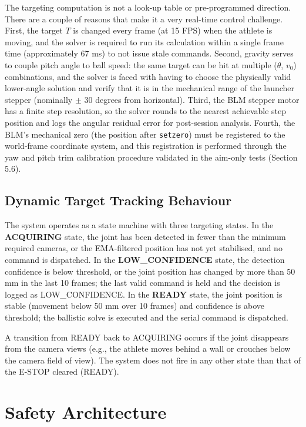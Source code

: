 The targeting computation is not a look-up table or pre-programmed direction. There are a couple of reasons that make it a very real-time control challenge. First, the target $T$ is changed every frame (at 15 FPS) when the athlete is moving, and the solver is required to run its calculation within a single frame time (approximately 67 ms) to not issue stale commands. Second, gravity serves to couple pitch angle to ball speed: the same target can be hit at multiple ($\theta$, $v_0$) combinations, and the solver is faced with having to choose the physically valid lower-angle solution and verify that it is in the mechanical range of the launcher stepper (nominally $\pm$ 30 degrees from horizontal). Third, the BLM stepper motor has a finite step resolution, so the solver rounds to the nearest achievable step position and logs the angular residual error for post-session analysis. Fourth, the BLM's mechanical zero (the position after \texttt{setzero}) must be registered to the world-frame coordinate system, and this registration is performed through the yaw and pitch trim calibration procedure validated in the aim-only tests (Section 5.6).

\subsection{Dynamic Target Tracking Behaviour}

The system operates as a state machine with three targeting states. In the \textbf{ACQUIRING} state, the joint has been detected in fewer than the minimum required cameras, or the EMA-filtered position has not yet stabilised, and no command is dispatched. In the \textbf{LOW\_CONFIDENCE} state, the detection confidence is below threshold, or the joint position has changed by more than 50 mm in the last 10 frames; the last valid command is held and the decision is logged as LOW\_CONFIDENCE. In the \textbf{READY} state, the joint position is stable (movement below 50 mm over 10 frames) and confidence is above threshold; the ballistic solve is executed and the serial command is dispatched.

A transition from READY back to ACQUIRING occurs if the joint disappears from the camera views (e.g., the athlete moves behind a wall or crouches below the camera field of view). The system does not fire in any other state than that of the E-STOP cleared (READY).

\section{Safety Architecture}

